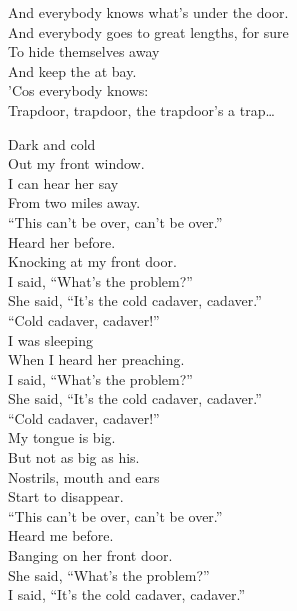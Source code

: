 And everybody knows what's under the door. \\
And everybody goes to great lengths, for sure \\
To hide themselves away \\
And keep the  at bay. \\
'Cos everybody knows: \\

Trapdoor, trapdoor, the trapdoor's a trap… \\




Dark and cold \\
Out my front window. \\
I can hear her say \\
From two miles away. \\

``This can't be over, can't be over.'' \\

Heard her before. \\
Knocking at my front door. \\
I said, ``What's the problem?'' \\
She said, ``It's the cold cadaver, cadaver.'' \\

``Cold cadaver, cadaver!'' \\

I was sleeping \\
When I heard her preaching. \\
I said, ``What's the problem?'' \\
She said, ``It's the cold cadaver, cadaver.'' \\

``Cold cadaver, cadaver!'' \\

My tongue is big. \\
But not as big as his. \\
Nostrils, mouth and ears \\
Start to disappear. \\

``This can't be over, can't be over.'' \\
Heard me before. \\
Banging on her front door. \\
She said, ``What's the problem?'' \\
I said, ``It's the cold cadaver, cadaver.'' \\

